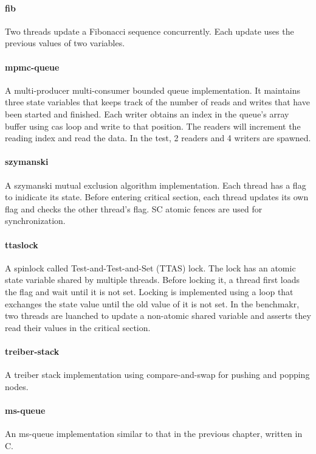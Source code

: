 \paragraph{fib} Two threads update a Fibonacci sequence concurrently. Each update uses the previous values of two variables.

\paragraph{mpmc-queue} A multi-producer multi-consumer bounded queue implementation. It maintains three state variables that keeps track of the number of reads and writes that have been started and finished. Each writer obtains an index in the queue's array buffer using cas loop and write to that position. The readers will increment the reading index and read the data. In the test, 2 readers and 4 writers are spawned.

\paragraph{szymanski} A szymanski mutual exclusion algorithm implementation. Each thread has a flag to inidicate its state. Before entering critical section, each thread updates its own flag and checks the other thread's flag. SC atomic fences are used for synchronization.


\paragraph{ttaslock} A spinlock called Test-and-Test-and-Set (TTAS) lock. The lock has an atomic state variable shared by multiple threads. Before locking it, a thread first loads the flag and wait until it is not set. Locking is implemented using a loop that exchanges the state value until the old value of it is not set. In the benchmakr, two threads are luanched to update a non-atomic shared variable and asserts they read their values in the critical section.

\paragraph{treiber-stack} A treiber stack\cite{treiber-stack} implementation using compare-and-swap for pushing and popping nodes.

\paragraph{ms-queue} An ms-queue implementation similar to that in the previous chapter, written in C.

